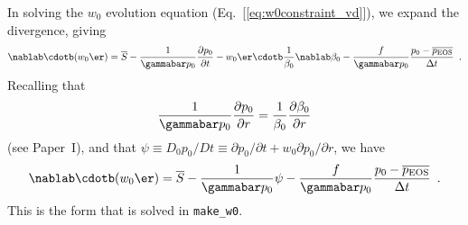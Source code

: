 In solving the $w_0$ evolution equation
(Eq.~[\ref{eq:w0constraint_vd}]), we expand the divergence, giving
\begin{equation}
\nablab \cdotb (w_0 \er)  = \overline{S} - \frac{1}{\gammabar p_0} \frac{\partial p_0}{\partial t} - 
w_0 \er  \cdotb \frac{1}{\beta_0} \nablab \beta_0  - \frac{f}{\gammabar p_0} \frac{p_0 - \overline{p_\mathrm{EOS}}}{\Delta t} \enskip .
\end{equation}
Recalling that 
\begin{equation*}
\frac{1}{\gammabar p_0} \frac{\partial p_0}{\partial r} = 
 \frac{1}{\beta_0} \frac{\partial \beta_0}{\partial r}
\end{equation*}
(see Paper~I), and that $\psi \equiv D_0 p_0 / Dt \equiv \partial p_0 / \partial t + 
w_0 \partial p_0 / \partial r$, we have
\begin{equation}
\nablab \cdotb (w_0 \er)  = \overline{S} - \frac{1}{\gammabar p_0} \psi -
 \frac{f}{\gammabar p_0} \frac{p_0 - \overline{p_\mathrm{EOS}}}{\Delta t} \enskip .
\end{equation}
This is the form that is solved in {\tt make\_w0}.


